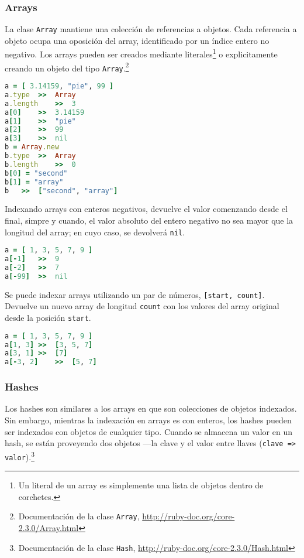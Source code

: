 \subsubsection{Arrays}
La clase \texttt{Array} mantiene una colección de referencias a objetos. Cada referencia a objeto ocupa una oposición del array, identificado por un índice entero no negativo.
Los arrays pueden ser creados mediante literales\footnote{Un literal de un array es simplemente una lista de objetos dentro de corchetes.} o explicitamente creando un objeto del tipo \texttt{Array}.\footnote{Documentación de la clase \texttt{Array}, \url{http://ruby-doc.org/core-2.3.0/Array.html}}

\begin{lstlisting}[language=Ruby]
a = [ 3.14159, "pie", 99 ]
a.type	>>	Array
a.length	>>	3
a[0]	>>	3.14159
a[1]	>>	"pie"
a[2]	>>	99
a[3]	>>	nil
b = Array.new
b.type	>>	Array
b.length	>>	0
b[0] = "second"
b[1] = "array"
b	>>	["second", "array"]
\end{lstlisting}

Indexando arrays con enteros negativos, devuelve el valor comenzando desde el final, simpre y cuando, el valor absoluto del entero negativo no sea mayor que la longitud del array; en cuyo caso, se devolverá \texttt{nil}.

\begin{lstlisting}[language=Ruby]
a = [ 1, 3, 5, 7, 9 ]
a[-1]	>>	9
a[-2]	>>	7
a[-99]	>>	nil
\end{lstlisting}

Se puede indexar arrays utilizando un par de números, \texttt{[start, count]}. Devuelve un nuevo array de longitud \texttt{count} con los valores del array original desde la posición \texttt{start}.

\begin{lstlisting}[language=Ruby]
a = [ 1, 3, 5, 7, 9 ]
a[1, 3]	>>	[3, 5, 7]
a[3, 1]	>>	[7]
a[-3, 2]	>>	[5, 7]
\end{lstlisting}

\subsubsection{Hashes}
Los hashes son similares a los arrays en que son colecciones de objetos indexados. Sin embargo, mientras la indexación en arrays es con enteros, los hashes pueden ser indexados con objetos de cualquier tipo. Cuando se almacena un valor en un hash, se están proveyendo dos objetos ---la clave y el valor entre llaves (\texttt{clave =>{ }valor}).\footnote{Documentación de la clase \texttt{Hash}, \url{http://ruby-doc.org/core-2.3.0/Hash.html}}

